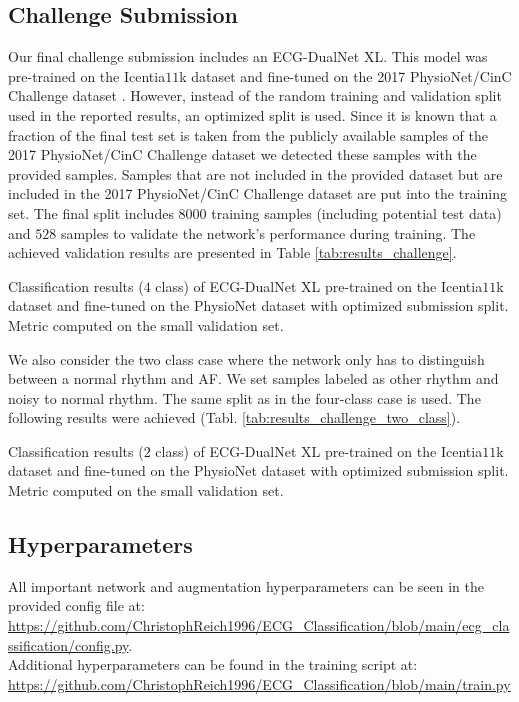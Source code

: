 \subsection{Challenge Submission} \label{subsec:challenge}

Our final challenge submission includes an ECG-DualNet XL. This model was pre-trained on the Icentia$11$k dataset \cite{Tan2019} and fine-tuned on the 2017 PhysioNet/CinC Challenge dataset \cite{Clifford2017}. However, instead of the random training and validation split used in the reported results, an optimized split is used. Since it is known that a fraction of the final test set is taken from the publicly available samples of the 2017 PhysioNet/CinC Challenge dataset we detected these samples with the provided samples. Samples that are not included in the provided dataset but are included in the 2017 PhysioNet/CinC Challenge dataset are put into the training set. The final split includes $8000$ training samples (including potential test data) and $528$ samples to validate the network's performance during training. The achieved validation results are presented in Table \ref{tab:results_challenge}.

\begin{table}[!ht]
    \centering
    \caption{Classification results ($4$ class) of ECG-DualNet XL pre-trained on the Icentia$11$k dataset and fine-tuned on the PhysioNet dataset with optimized submission split. Metric computed on the small validation set.}
    
    \label{tab:results_challenge}
\end{table}

We also consider the two class case where the network only has to distinguish between a normal rhythm and AF. We set samples labeled as other rhythm and noisy to normal rhythm. The same split as in the four-class case is used. The following results were achieved (Tabl. \ref{tab:results_challenge_two_class}).

\begin{table}[!ht]
    \centering
    \caption{Classification results ($2$ class) of ECG-DualNet XL pre-trained on the Icentia$11$k dataset and fine-tuned on the PhysioNet dataset with optimized submission split. Metric computed on the small validation set.}
    
    \label{tab:results_challenge_two_class}
\end{table}

\subsection{Hyperparameters}\label{subsec:hyperparameters}

All important network and augmentation hyperparameters can be seen in the provided config file at: \url{https://github.com/ChristophReich1996/ECG_Classification/blob/main/ecg_classification/config.py}.\\
Additional hyperparameters can be found in the training script at: \url{https://github.com/ChristophReich1996/ECG_Classification/blob/main/train.py}